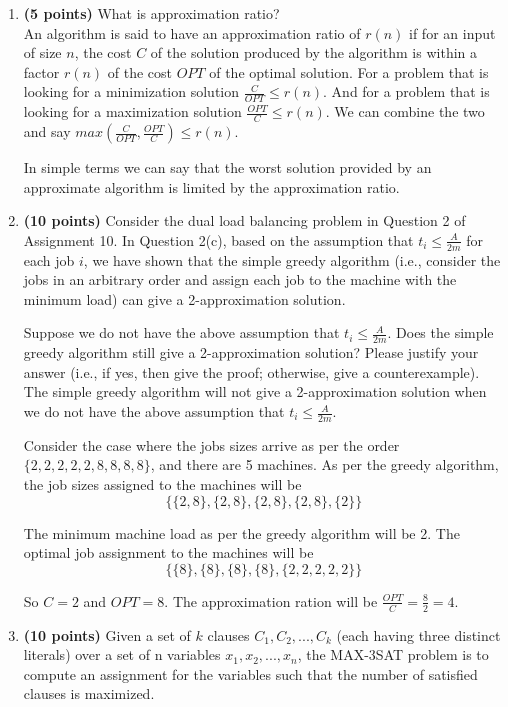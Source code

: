\documentclass[paper=a4, fontsize=11pt]{scrartcl} %
\numberwithin{figure}{section} %
\numberwithin{table}{section} %
\begin{document}
\begin{enumerate}
\item \textbf{(5 points)} What is approximation ratio?\\

An algorithm is said to have an approximation ratio of $r(n)$ if for an input of size $n$, the cost $C$ of the solution produced by the algorithm is within a factor $r(n)$ of the cost $OPT$ of the optimal solution. For a problem that is looking for a minimization solution $\frac{C}{OPT} \leq r(n)$. And for a problem that is looking for a maximization solution $\frac{OPT}{C} \leq r(n)$. We can combine the two and say $max \left (\frac{C}{OPT}, \frac{OPT}{C} \right ) \leq r(n)$.

In simple terms we can say that the worst solution provided by an approximate algorithm is limited by the approximation ratio.

\item \textbf{(10 points)} Consider the dual load balancing problem in Question 2 of Assignment 10. In Question 2(c), based on the assumption that $t_i \leq \frac{A}{2m}$ for each job $i$, we have shown that the simple greedy algorithm (i.e., consider the jobs in an arbitrary order and assign each job to the machine with the minimum load) can give a 2-approximation solution.

Suppose we do not have the above assumption that $t_i \leq \frac{A}{2m}$. Does the simple greedy algorithm still give a 2-approximation solution? Please justify your answer (i.e., if yes, then give the proof; otherwise, give a counterexample).\\

The simple greedy algorithm will not give a 2-approximation solution when we do not have the above assumption that $t_i \leq \frac{A}{2m}$.

Consider the case where the jobs sizes arrive as per the order $\{2, 2, 2, 2, 2, 8, 8, 8, 8\}$, and there are 5 machines. As per the greedy algorithm, the job sizes assigned to the machines will be 
$$
\{\{2, 8\}, \{2, 8\}, \{2, 8\}, \{2, 8\}, \{2\}\}
$$ 

The minimum machine load as per the greedy algorithm will be 2. The optimal job assignment to the machines will be 
$$
\{\{8\}, \{8\}, \{8\}, \{8\}, \{2, 2, 2, 2, 2\}\}
$$

So $C=2$ and $OPT=8$. The approximation ration will be $\frac{OPT}{C} = \frac{8}{2} = 4$.

\item \textbf{(10 points)} Given a set of $k$ clauses $C_1, C_2, . . . , C_k$ (each having three distinct literals) over a set of n variables $x_1, x_2, . . . , x_n$, the MAX-3SAT problem is to compute an assignment for the variables such that the number of satisfied clauses is maximized.


\end{enumerate}
\end{document}
